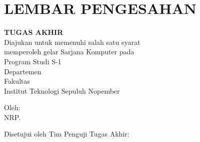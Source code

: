 \chapter*{LEMBAR PENGESAHAN}


\begin{center}
  \textbf{\tatitle{}}
\end{center}

\begingroup
\small

\begin{center}
  \textbf{TUGAS AKHIR}
  \\Diajukan untuk memenuhi salah satu syarat \\
  memperoleh gelar Sarjana Komputer pada \\
  Program Studi S-1 \studyprogram{} \\
  Departemen \department{} \\
  Fakultas \faculty{} \\
  Institut Teknologi Sepuluh Nopember
\end{center}

\begin{center}
  Oleh: \textbf{\name{}}
  \\NRP. \nrp{}
\end{center}

\begin{center}
  Disetujui oleh Tim Penguji Tugas Akhir:
\end{center}

\begingroup
\setlength{\tabcolsep}{0pt}

